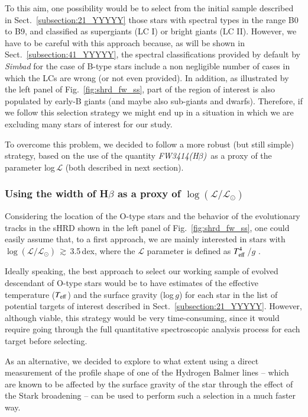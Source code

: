 \documentclass{aa}
\newcommand{\Teff}{\mbox{$T_{\rm eff}$}}
\newcommand{\logLs}{$\log (\mathcal{L}/\mathcal{L}_{\odot})$}
\newcommand{\fwhb}{\textit{FW3414(H$\beta$)}}
\begin{document}
To this aim, one possibility would be to select from the initial sample described in Sect.~\ref{subsection:21_YYYYY} those stars with spectral types in the range B0 to B9, and classified as supergiants (LC I) or bright giants (LC II). However, we have to be careful with this approach because, as will be shown in Sect.~\ref{subsection:41_YYYYY}, the spectral classifications provided by default by \textit{Simbad} for the case of B-type stars include a non negligible number of cases in which the LCs are wrong (or not even provided). In addition, as illustrated by the left panel of Fig.~\ref{fig:shrd_fw_ss}, part of the region of interest is also populated by early-B giants (and maybe also sub-giants and dwarfs). Therefore, if we follow this selection strategy we might end up in a situation in which we are excluding many stars of interest for our study.

To overcome this problem, we decided to follow a more robust (but still simple) strategy, based on the use of the quantity \fwhb\ as a proxy of the parameter log\,$\mathcal{L}$ (both described in next section).


\subsubsection{\texorpdfstring{Using the width of H$\beta$ as a proxy of \logLs}{Using the width of Hb as a proxy of logLs}}
\label{subsubsection:312_ZZZZZ}

Considering the location of the O-type stars and the behavior of the evolutionary tracks in the sHRD shown in the left panel of Fig.~\ref{fig:shrd_fw_ss}, one could easily assume that, to a first approach, we are mainly interested in stars with \logLs\,$\gtrsim$\,3.5\,dex, where the $\mathcal{L}$ parameter is defined as $T_{\rm eff}^4$\,/$g$ \citep{2014A&A...564A..52L}.

Ideally speaking, the best approach to select our working sample of evolved descendant of O-type stars would be to have estimates of the effective temperature (\Teff) and the surface gravity (log\,$g$) for each star in the list of potential targets of interest described in Sect.~\ref{subsection:21_YYYYY}. However, although viable, this strategy would be very time-consuming, since it would require going through the full quantitative spectroscopic analysis process for each target before selecting.

As an alternative, we decided to explore to what extent using a direct measurement of the profile shape of one of the Hydrogen Balmer lines -- which are known to be affected by the surface gravity of the star through the effect of the Stark broadening -- can be used to perform such a selection in a much faster way.
\end{document}
